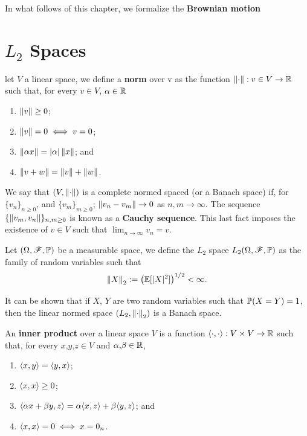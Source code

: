 \documentclass[../TGMAFFIRO]{subfiles}
\begin{document}
In what follows of this chapter, we formalize the \textbf{Brownian motion}
\section{$L_2$ Spaces}
\begin{definition}
	let $V$ a linear space, we define a \textbf{norm} over v as the function $\left\lVert\cdot\right\rVert: v \in V \to \mathbb{R}$ such that, for every $v\in V$, $\alpha \in \mathbb{R}$
	\begin{enumerate}
		\item $\left\lVert v\right\rVert\geq 0$;
		\item $\left\lVert v\right\rVert = 0 \iff v = 0$;
		\item $\left\lVert\alpha x\right\rVert = |\alpha| \left\lVert x\right\rVert$; and
		\item $\left\lVert v + w\right\rVert = \left\lVert v\right\rVert + \left\lVert w\right\rVert$.
	\end{enumerate}
\end{definition}	
We say that $(V, \left\lVert\cdot\right\rVert)$ is a complete normed spaced (or a Banach space) if, for $\{v_n\}_{n\geq 0}$, and $\{v_m\}_{m\geq 0}$; $\left\lVert v_n - v_m\right\rVert \to 0$ as $n, m \to \infty$. The sequence $\{\left\lVert v_m, v_n\right\rVert\}_{n,m \geq 0}$ is known as a \textbf{Cauchy sequence}. This last fact imposes the existence of $v\in V$ such that $\lim_{n\to\infty} v_n = v$.

\begin{definition}
Let $(\Omega, \mathscr{F}, \mathbb{P})$ be a measurable space, we define the $L_2$ space $L_2(\Omega, \mathscr{F}, \mathbb{P}) $ as the family of random variables such that
	\begin{equation}
		\left\lVert X\right\rVert_2:= \left(\mathbb{E}[|X|^2] \right)^{1/2} < \infty.
	\end{equation}
\end{definition}

It can be shown that if $X$, $Y$ are two random variables such that $\mathbb{P}(X=Y) = 1$, then the linear normed space $(L_2, \left\lVert\cdot\right\rVert_2)$ is a Banach space.

\begin{definition}
	An \textbf{inner product} over a linear space $V$ is a function $\langle \cdot, \cdot\rangle : V\times V \to \mathbb{R}$ such that, for every $x\text{,}y\text{,}z\in V$ and $\alpha\text{,}\beta \in \mathbb{R}$,
	\begin{enumerate}
		\item $\langle x, y\rangle = \langle y, x\rangle$;
		\item $\langle x, x\rangle \geq 0$;
		\item $\langle \alpha x + \beta y, z\rangle = \alpha\langle x, z\rangle + \beta\langle y, z\rangle$; and
		\item $\langle x, x\rangle = 0 \iff x = 0_n$.
	\end{enumerate}	
\end{definition}
\end{document}
